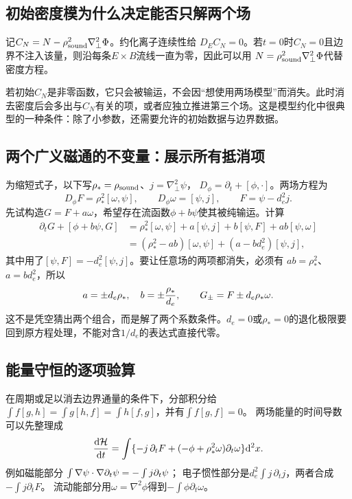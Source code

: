\documentclass[UTF8,a4paper,11pt,openany,fontset=fandol]{ctexbook}
\begin{document}
\subsection{初始密度模为什么决定能否只解两个场}
记$C_N=N-\rho_{\rm sound}^2\nabla_\perp^2\Phi$。约化离子连续性给
$D_EC_N=0$。若$t=0$时$C_N=0$且边界不注入该量，则沿每条$E\times B$流线一直为零，因此可以用
$N=\rho_{\rm sound}^2\nabla_\perp^2\Phi$代替密度方程。

若初始$C_N$是非零函数，它只会被输运，不会因“想使用两场模型”而消失。此时消去密度后会多出与$C_N$有关的项，或者应独立推进第三个场。这是模型约化中很典型的一种条件：除了小参数，还需要允许的初始数据与边界数据。

\subsection{两个广义磁通的不变量：展示所有抵消项}
为缩短式子，以下写$\rho_*=\rho_{\rm sound}$、$j=\nabla_\perp^2\psi$，
$D_\phi=\partial_t+[\phi,\cdot]$。两场方程为
\begin{equation}
 D_\phi F=\rho_*^2[\omega,\psi],\qquad
 D_\phi\omega=[\psi,j],\qquad F=\psi-d_e^2j.
\end{equation}
先试构造$G=F+a\omega$，希望存在流函数$\phi+b\psi$使其被纯输运。计算
\begin{align}
 \partial_tG+[\phi+b\psi,G]
 &=\rho_*^2[\omega,\psi]+a[\psi,j]+b[\psi,F]+ab[\psi,\omega]\\
 &=(\rho_*^2-ab)[\omega,\psi]+(a-bd_e^2)[\psi,j],
\end{align}
其中用了$[\psi,F]=-d_e^2[\psi,j]$。要让任意场的两项都消失，必须有
$ab=\rho_*^2$、$a=bd_e^2$，所以
\begin{equation}
 a=\pm d_e\rho_*,\quad b=\pm{\rho_*\over d_e},\qquad
 G_\pm=F\pm d_e\rho_*\omega.
\end{equation}
这不是凭空猜出两个组合，而是解了两个系数条件。$d_e=0$或$\rho_*=0$的退化极限要回到原方程处理，不能对含$1/d_e$的表达式直接代零。

\subsection{能量守恒的逐项验算}
在周期或足以消去边界通量的条件下，分部积分给
$\int f[g,h]=\int g[h,f]=\int h[f,g]$，并有$\int f[g,f]=0$。
两场能量的时间导数可以先整理成
\begin{equation}
 {\mathrm d\mathcal H\over\mathrm dt}
 =\int\{-j\,\partial_tF+(-\phi+\rho_*^2\omega)\partial_t\omega\}\mathrm d^2x.
\end{equation}
例如磁能部分
$\int\nabla\psi\cdot\nabla\partial_t\psi=-\int j\partial_t\psi$；
电子惯性部分是$d_e^2\int j\,\partial_tj$，两者合成$-\int j\partial_tF$。
流动能部分用$\omega=\nabla^2\phi$得到$-\int\phi\partial_t\omega$。
\end{document}
